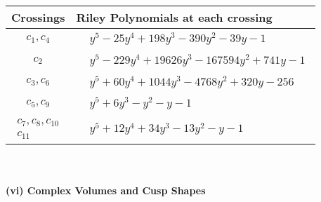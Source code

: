 \documentclass[1p]{elsarticle_modified}
\theoremstyle{definition}
\begin{document}
\begin{tabular}{m{50pt}|m{274pt}}
Crossings & \hspace{64pt}Riley Polynomials at each crossing \\
\hline $$\begin{aligned}c_{1},c_{4}\end{aligned}$$&$\begin{aligned}
&y^5-25 y^4+198 y^3-390 y^2-39 y-1
\end{aligned}$\\
\hline $$\begin{aligned}c_{2}\end{aligned}$$&$\begin{aligned}
&y^5-229 y^4+19626 y^3-167594 y^2+741 y-1
\end{aligned}$\\
\hline $$\begin{aligned}c_{3},c_{6}\end{aligned}$$&$\begin{aligned}
&y^5+60 y^4+1044 y^3-4768 y^2+320 y-256
\end{aligned}$\\
\hline $$\begin{aligned}c_{5},c_{9}\end{aligned}$$&$\begin{aligned}
&y^5+6 y^3- y^2- y-1
\end{aligned}$\\
\hline $$\begin{aligned}c_{7},c_{8},c_{10}\\c_{11}\end{aligned}$$&$\begin{aligned}
&y^5+12 y^4+34 y^3-13 y^2- y-1
\end{aligned}$\\
\hline
\end{tabular}\\~\\
\newpage\flushleft \textbf{(vi) Complex Volumes and Cusp Shapes}
\end{document}
